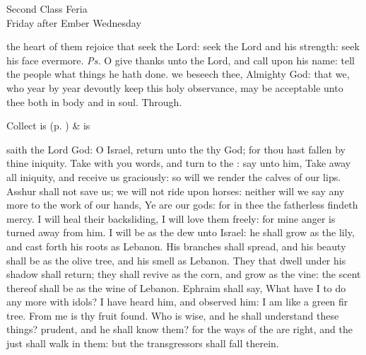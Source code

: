 \begin{inhead}
    {Second Class Feria\\
Friday after Ember Wednesday}
\end{inhead}
\par\noindent
\introit
{} the heart of them rejoice that seek the Lord: seek the Lord and his strength: seek his face evermore. \textit{Ps.} O give thanks unto the Lord, and call upon his name: tell the people what things he hath done.
\collect
{} we beseech thee, Almighty God: that we, who year by year devoutly keep this holy observance, may be acceptable unto thee both in body and in soul. Through.
\begin{rubric}
     Collect is  (p. \pageref{SPSaints}) \&  is 
\end{rubric}

 saith the Lord God: O Israel, return unto the  thy God; for thou hast fallen by thine iniquity. Take with you words, and turn to the : say unto him, Take away all iniquity, and receive us graciously: so will we render the calves of our lips. Asshur shall not save us; we will not ride upon horses: neither will we say any more to the work of our hands, Ye are our gods: for in thee the fatherless findeth mercy. I will heal their backsliding, I will love them freely: for mine anger is turned away from him. I will be as the dew unto Israel: he shall grow as the lily, and cast forth his roots as Lebanon. His branches shall spread, and his beauty shall be as the olive tree, and his smell as Lebanon. They that dwell under his shadow shall return; they shall revive as the corn, and grow as the vine: the scent thereof shall be as the wine of Lebanon. Ephraim shall say, What have I to do any more with idols? I have heard him, and observed him: I am like a green fir tree. From me is thy fruit found. Who is wise, and he shall understand these things? prudent, and he shall know them? for the ways of the  are right, and the just shall walk in them: but the transgressors shall fall therein.


